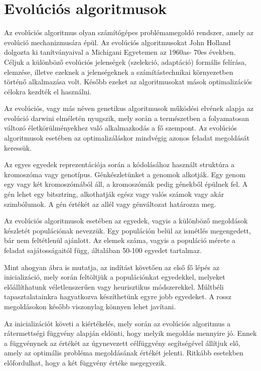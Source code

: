 \documentclass[12pt,a4paper,oneside]{report}
\begin{document}
\chapter{Evolúciós algoritmusok} %

Az evolúciós algoritmus olyan számítógépes problémamegoldó rendszer, amely az evolúció mechanizmusára épül. Az evolúciós algoritmusokat John Holland dolgozta ki tanítványaival a Michigani Egyetemen az 1960as- 70es években. Céljuk a különböző evolúciós jelenségek (szelekció, adaptáció) formális felírása, elemzése, illetve ezeknek a jelenségeknek a számítástechnikai környezetben történő alkalmazása volt. Később ezeket az algoritmusokat mások optimalizációs célokra kezdték el használni.

Az evolúciós, vagy más néven genetikus algoritmusok működési elvének alapja az evolúció darwini elméletén nyugszik, mely során a természetben a folyamatosan változó életkörülményekhez való alkalmazkodás a fő szempont. Az evolúciós algoritmusok esetében az optimalizáláskor mindvégig azonos feladat megoldását keressük.

Az egyes egyedek reprezentációja során a kódolásához használt struktúra a kromoszóma vagy genotípus. Génkészletünket a genomok alkotják. Egy genom egy vagy két kromoszómából áll, a kromoszómák pedig génekből épülnek fel. A gén lehet egy bitsztring, alkothatják egész vagy valós számok vagy akár szimbólumok. A gén értékét az allél vagy génváltozat határozza meg.

Az evolúciós algoritmusok esetében az egyedek, vagyis a különböző megoldások készletét populációnak nevezzük. Egy populáción belül az ismétlés megengedett, bár nem feltétlenül ajánlott. Az elemek száma, vagyis a populáció mérete a feladat sajátosságaitól függ, általában 50-100 egyedet tartalmaz.


Mint ahogyan  ábra is mutatja, az indítást követően az első fő lépés az inicializáció, mely során feltöltjük a populációnkat egyedekkel, melyeket előállíthatunk véletlenszerűen vagy heurisztikus módszerekkel. Múltbéli tapasztalatainkra hagyatkozva készíthetünk egyre jobb egyedeket. A rossz megoldásokon később viszonylag könnyen lehet javítani. 

Az inicializációt követi a kiértékelés, mely során az evolúciós algoritmus a rátermettségi függvény alapján eldönti, hogy melyik megoldás mennyire jó. Ennek a függvénynek az értékét az úgynevezett célfüggvény segítségével állítjuk elő, amely az optimális probléma megoldásának értékét jelenti. Ritkább esetekben előfordulhat, hogy a két függvény értéke megegyezik.
\end{document}
